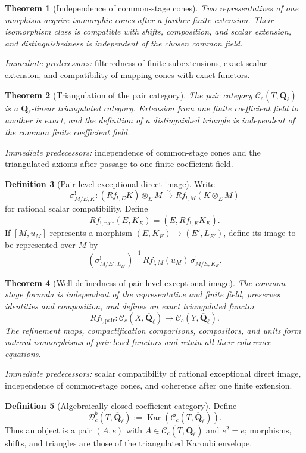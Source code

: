 \documentclass[10pt]{article}
\newtheorem{theorem}{Theorem}[section]
\theoremstyle{definition}
\newtheorem{definition}[theorem]{Definition}
\newcommand{\Qlb}{\overline{\mathbf Q}_\ell}
\newcommand{\Dbc}{\mathcal D^b_c}
\newcommand{\Kar}{\operatorname{Kar}}
\newcommand{\pred}[1]{\par\smallskip\begingroup\footnotesize\raggedright
\emph{Immediate predecessors:} #1.\par\endgroup}
\begin{document}
\begin{theorem}[Independence of common-stage cones]
Two representatives of one morphism acquire isomorphic cones after a
further finite extension.  Their isomorphism class is compatible with
shifts, composition, and scalar extension, and distinguishedness is
independent of the chosen common field.
\end{theorem}
\pred{filteredness of finite subextensions, exact scalar extension, and compatibility of mapping cones with exact functors}

\begin{theorem}[Triangulation of the pair category]
The pair category \(\mathcal C_c(T,\Qlb)\) is a
\(\Qlb\)-linear triangulated category.  Extension from one finite coefficient field to
another is exact, and the definition of a distinguished triangle is
independent of the common finite coefficient field.
\end{theorem}
\pred{independence of common-stage cones and the triangulated axioms after passage to one finite coefficient field}

\begin{definition}[Pair-level exceptional direct image]
Write
\[
 \sigma^!_{M/E,K}:(Rf_{!,E}K)\otimes_EM
 \xrightarrow{\sim}Rf_{!,M}(K\otimes_EM)
\]
for rational scalar compatibility.  Define
\[
 Rf_{!,\mathrm{pair}}(E,K_E)=(E,Rf_{!,E}K_E).
\]
If \([M,u_M]\) represents a morphism
\((E,K_E)\to(E',L_{E'})\), define its image to be represented over \(M\)
by
\[
 (\sigma^!_{M/E',L_{E'}})^{-1}\,
 Rf_{!,M}(u_M)\,\sigma^!_{M/E,K_E}.
\]
\end{definition}

\begin{theorem}[Well-definedness of pair-level exceptional image]
The common-stage formula is independent of the representative and finite
field, preserves identities and composition, and defines an exact
triangulated functor
\[
 Rf_{!,\mathrm{pair}}:
 \mathcal C_c(X,\Qlb)\longrightarrow\mathcal C_c(Y,\Qlb).
\]
The refinement maps, compactification comparisons, compositors, and units
form natural isomorphisms of pair-level functors and retain all their
coherence equations.
\end{theorem}
\pred{scalar compatibility of rational exceptional direct image, independence of common-stage cones, and coherence after one finite extension}

\begin{definition}[Algebraically closed coefficient category]
Define
\[
 \Dbc(T,\Qlb):=\Kar(\mathcal C_c(T,\Qlb)).
\]
Thus an object is a pair \((A,e)\) with \(A\in\mathcal C_c(T,\Qlb)\) and
\(e^2=e\); morphisms, shifts, and triangles are those of the triangulated
Karoubi envelope.
\end{definition}
\end{document}
